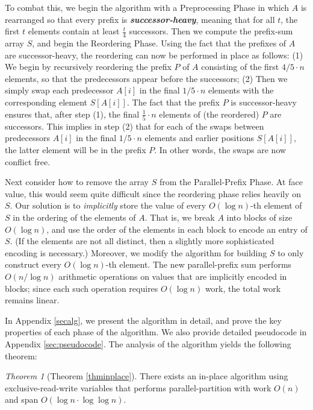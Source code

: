 \documentclass[twocolumn,10pt]{article}
\newcommand{\defn}[1]{{\textit{\textbf{\boldmath #1}}}\xspace}
\theoremstyle{remark}
\newtheorem{theorem}{Theorem}[section]
\theoremstyle{remark}
\begin{document}
To combat this, we begin the algorithm with a Preprocessing Phase in
which $A$ is rearranged so that every prefix is
\defn{successor-heavy}, meaning that for all $t$, the first $t$
elements contain at least $\frac{t}{4}$ successors. Then we compute
the prefix-sum array $S$, and begin the Reordering Phase. Using the
fact that the prefixes of $A$ are successor-heavy, the reordering can
now be performed in place as follows: (1) We begin by recursively
reordering the prefix $P$ of $A$ consisting of the first $4/5 \cdot n$
elements, so that the predecessors appear before the successors; (2)
Then we simply swap each predecessor $A[i]$ in the final $1/5 \cdot n$
elements with the corresponding element $S[A[i]]$. The fact that the
prefix $P$ is successor-heavy ensures that, after step (1), the final 
$\frac{1}{5} \cdot n$ elements of (the reordered) $P$ are successors. 
This implies in step (2) that for each of the swaps between predecessors $A[i]$
in the final $1/5 \cdot n$ elements and earlier positions $S[A[i]]$, the latter
element will be in the prefix $P$. In other words, the swaps are now conflict
free.

Next consider how to remove the array $S$ from the Parallel-Prefix
Phase. At face value, this would seem quite difficult since the
reordering phase relies heavily on $S$. Our solution is to
\emph{implicitly} store the value of every $O(\log n)$-th element of
$S$ in the ordering of the elements of $A$. That is, we break $A$ into
blocks of size $O(\log n)$, and use the order of the elements in each
block to encode an entry of $S$. (If the elements are not all
  distinct, then a slightly more sophisticated encoding is necessary.)
Moreover, we modify the algorithm for building $S$ to only construct
every $O(\log n)$-th element. The new parallel-prefix sum performs
$O(n / \log n)$ arithmetic operations on values that are implicitly
encoded in blocks; since each such operation requires $O(\log n)$
work, the total work remains linear.

In Appendix \ref{secalg}, we present the algorithm in detail,
and prove the key properties of each phase of the algorithm. We also
provide detailed pseudocode in Appendix \ref{sec:pseudocode}. 
The analysis of the algorithm yields the following theorem:
\begin{theorem}[Theorem \ref{thminplace}]
  There exists an in-place algorithm using exclusive-read-write
  variables that performs parallel-partition with work $O(n)$ and span
  $O(\log n \cdot \log \log n)$.
\end{theorem}
\end{document}
